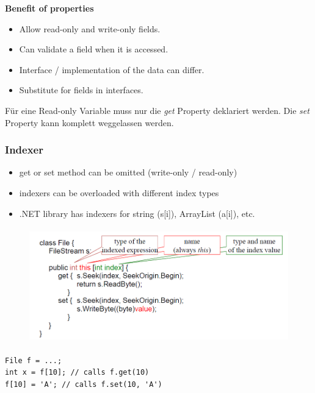 \textbf{Benefit of properties}
\begin{multicols}{2}
\begin{itemize}
	\item Allow read-only and write-only fields.
	\item Can validate a field when it is accessed.
\end{itemize}

\columnbreak

\begin{itemize}
	\item Interface / implementation of the data can differ.
	\item Substitute for fields in interfaces.
\end{itemize}
\end{multicols}
Für eine Read-only Variable muss nur die \textit{get} Property deklariert werden. Die \textit{set} Property
kann komplett weggelassen werden.

\subsubsection{Indexer}
\begin{itemize}
	\item get or set method can be omitted (write-only / read-only)
	\item indexers can be overloaded with different index types
	\item .NET library has indexers for string (s[i]), ArrayList (a[i]), etc.
\end{itemize}

\begin{figure}[h]
	\centering
	\includegraphics[height=5cm, ]{images/CSharp/Indexer}
\end{figure}

\begin{lstlisting}
File f = ...;
int x = f[10]; // calls f.get(10)
f[10] = 'A'; // calls f.set(10, 'A')
\end{lstlisting}

